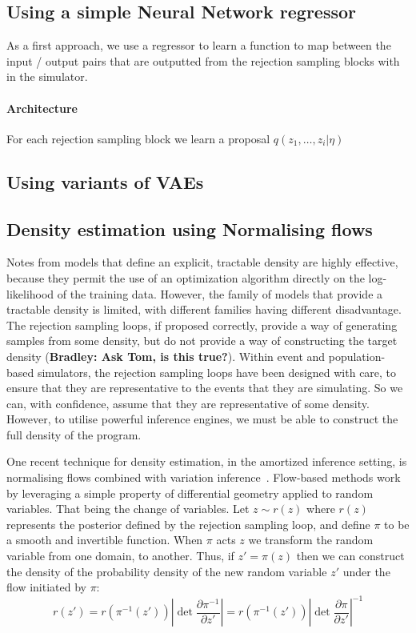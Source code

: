 \documentclass{article}
\begin{document}
\subsection{Using a simple Neural Network regressor}

As a first approach, we use a regressor to learn a function to map
between the input / output pairs that are outputted from the rejection
sampling blocks with in the simulator. 

\paragraph{Architecture} For each rejection sampling block we learn a proposal $q(z_1, \ldots, z_i | \eta)$
\subsection{Using variants of VAEs}

\subsection{Density estimation using Normalising flows}
Notes from models that define an explicit,  
tractable density are highly effective, 
because they permit the use of an optimization algorithm directly on the log-likelihood of the training data.
However,  the  family  of  models  that provide  a  tractable  density  is  limited,
with  different  families  having  different disadvantage.
The rejection sampling loops, if proposed correctly, provide a way of generating 
samples from some density, but do not provide a way of constructing the target density (\textbf{Bradley: Ask Tom, is this true?}). 
Within event and population-based simulators, the rejection sampling loops have been designed with care,
to ensure that they are representative to the events that they are simulating. So we can, with confidence,
assume that they are representative of some density. 
However, to utilise powerful inference engines, we must be able to construct the 
full density of the program. 

One recent technique for density estimation, in the amortized inference setting,
is normalising flows combined with variation inference~\cite{rezende2015variational}.
Flow-based methods work by leveraging a simple property of differential geometry applied 
to random variables. 
That being the change of variables.
Let $z \sim r(z)$ where $r(z)$ represents the posterior defined by the rejection
sampling loop, and define $\pi$ to be a smooth and invertible function.
When $\pi$ acts $z$ we transform the random variable from one domain, to another. 
Thus, if $z\prime = \pi(z)$ then we can construct the density of  
the probability density of the new random variable $z\prime$ under the flow initiated by $\pi$: 
\begin{equation}
r(z\prime) = r(\pi^{-1}(z\prime)) \left|\det \frac{\partial \pi^{-1}}{\partial z'}\right| = r(\pi^{-1}(z\prime)) \left|\det \frac{\partial \pi}{\partial z\prime}\right|^{-1} 
\end{equation}
\end{document}
